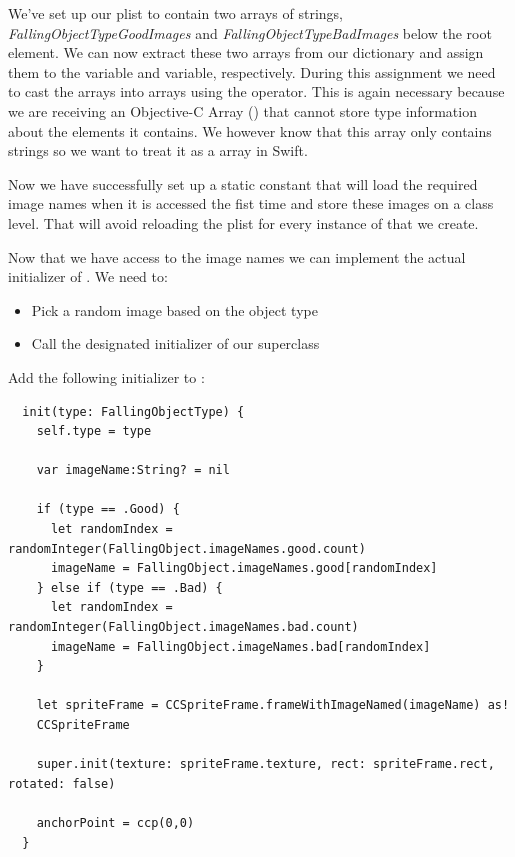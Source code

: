We've set up our plist to contain two arrays of strings,
\textit{FallingObjectTypeGoodImages} and \textit{FallingObjectTypeBadImages}
below the root element. We can now extract these two arrays from our dictionary
and assign them to the  variable and  variable, respectively. During
this assignment we need to cast the arrays into \inlinecode{[String]} arrays
using the  operator. This is again necessary because we are
receiving an Objective-C Array () that cannot store type information
about the elements it contains. We however know that this array only contains
strings so we want to treat it as a \inlinecode{[String]} array in Swift.

Now we have successfully set up a static constant that will load the required
image names when it is accessed the fist time and store these images on a class
level. That will avoid reloading the plist for every instance of
 that we create.
  
Now that we have access to the image names we can implement the actual
initializer of . We need to:
\begin{itemize}
  \item Pick a random image based on the object type
  \item Call the designated initializer of our superclass \ccsprite{}
\end{itemize}

\begin{leftbar}
Add the following initializer to :
\begin{lstlisting}
  init(type: FallingObjectType) {
    self.type = type
    
    var imageName:String? = nil
    
    if (type == .Good) {
      let randomIndex = randomInteger(FallingObject.imageNames.good.count)
      imageName = FallingObject.imageNames.good[randomIndex]
    } else if (type == .Bad) {
      let randomIndex = randomInteger(FallingObject.imageNames.bad.count)
      imageName = FallingObject.imageNames.bad[randomIndex]
    }
    
    let spriteFrame = CCSpriteFrame.frameWithImageNamed(imageName) as!
    CCSpriteFrame 
    
    super.init(texture: spriteFrame.texture, rect: spriteFrame.rect, rotated: false)
    
    anchorPoint = ccp(0,0)
  }
\end{lstlisting}
\end{leftbar}

